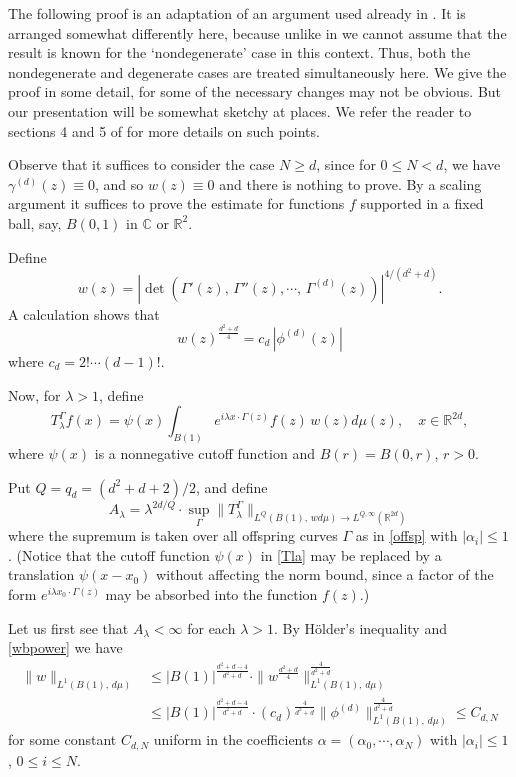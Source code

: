 \documentclass[11 pt]{amsart}
\theoremstyle{plain}
\numberwithin{equation}{section}
\theoremstyle{plain}
\numberwithin{equation}{section}
\theoremstyle{remark}
\begin{document}
\medskip
The following proof is an adaptation of an argument used already in \cite{BOS3}. It is arranged somewhat differently here, because unlike in \cite{BOS3} we cannot assume that the result is known for the `nondegenerate' case in this context. Thus, both the nondegenerate and degenerate cases are treated simultaneously here. We give the proof in some detail, for some of the necessary changes may not be obvious. But our presentation will be somewhat sketchy at places. We refer the reader to sections 4 and 5 of \cite{BOS3} for more details on such points.

Observe that it suffices to consider the case $N\ge d$, since for $0\le N < d$, we have $\gamma^{(d)}(z) \equiv 0$, and so $w(z) \equiv 0$ and there is nothing to prove.
By a scaling argument it suffices to prove the estimate for functions $f$
supported in a fixed ball, say, $B(0,1)$ in ${{\mathbb {C}}}$ or ${{\mathbb {R}}}^2$.

Define
\[ w (z) = |\det (\Gamma '(z), \,\Gamma''(z), \cdots,\, \Gamma^{(d)}(z))|^{4/(d^2+d)} .\]
A calculation shows that
\begin{equation}\label{wbpower}
w(z)^{\frac{d^2+d}{4}} = c_d \, |\phi^{(d)}(z)|
\end{equation}
where $c_d = 2! \cdots (d-1)!$.

Now, for ${\lambda} >1$, define
\begin{equation}\label{Tla}
T_{\lambda}^{\Gamma} f(x)=  \psi(x) \int_{B(1)} e^{i{\lambda} x\cdot
\Gamma (z)} f(z) \, w (z) d\mu(z), \quad x\in {{\mathbb {R}}}^{2d} ,
\end{equation}
where $\psi(x)$ is a nonnegative cutoff function and $B(r) = B(0,r)$, $r>0$.

Put $Q =q_d = (d^2+d+2)/2$, and define
\begin{equation}\label{Al}
A_{\lambda} = {\lambda}^{2d/Q} \cdot \sup_{\Gamma}\| T_{\lambda}^{\Gamma}
\|_{L^{Q}(B(1) , \, w d\mu )\rightarrow L^{Q,\infty}({{\mathbb {R}}}^{2d})}
\end{equation}
where the supremum is taken over all offspring curves $\Gamma$ as in \eqref{offsp} with $|\alpha_i|\le 1$.
(Notice that the cutoff function $\psi(x)$ in \eqref{Tla} may be replaced by a translation $\psi(x - x_0)$ without affecting the norm bound, since a factor of the form $e^{i{\lambda} x_0 \cdot \Gamma (z)}$ may be absorbed into the function $f(z)$.)

\medskip

Let us first see that $A_{\lambda} < \infty$ for each ${\lambda} >1$. By
H\"older's inequality and \eqref{wbpower} we have
\begin{align*}
 \| w \|_{L^1(B(1) , \, d\mu )} &\le |B(1)|^{\frac{d^2+d-4}{d^2+d}}\cdot \| w^{\frac{d^2+d}{4}} \|_{L^1(B(1) , \, d\mu
)}^{\frac{4}{d^2+d}} \\
&\le | B(1) |^{\frac{d^2+d-4}{d^2+d}} \cdot (c_d)^{\frac{4}{d^2+d}} \| \phi^{(d)}\|_{L^1(B(1) , \, d\mu
)}^{\frac{4}{d^2+d}} \le C_{d,N}
\end{align*}
for some constant $C_{d,N}$ uniform in the coefficients $\alpha = (\alpha_0, \cdots, \alpha_N)$ with
$|\alpha_i|\le 1$, $0\le i\le N$.
\end{document}
